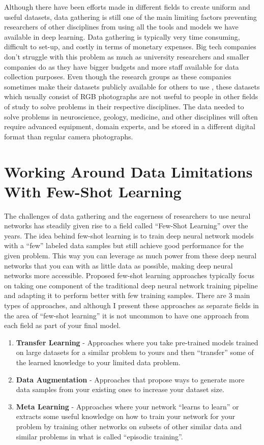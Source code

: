 Although there have been efforts made in different fields to create uniform and useful datasets, data gathering is still one of the main limiting factors preventing researchers of other disciplines from using all the tools and models we have available in deep learning. Data gathering is typically very time consuming, difficult to set-up, and costly in terms of monetary expenses. Big tech companies don't struggle with this problem as much as university researchers and smaller companies do as they have bigger budgets and more staff available for data collection purposes. Even though the research groups as these companies sometimes make their datasets publicly available for others to use \cite{ImageNet} \cite{COCO} \cite{StyleGAN1}, these datasets which usually consist of RGB photographs are not useful to people in other fields of study to solve problems in their respective disciplines. The data needed to solve problems in neuroscience, geology, medicine, and other disciplines will often require advanced equipment, domain experts, and be stored in a different digital format than regular camera photographs.

\section{Working Around Data Limitations With Few-Shot Learning}
The challenges of data gathering and the eagerness of researchers to use neural networks has steadily given rise to a field called ``Few-Shot Learning'' over the years. The idea behind few-shot learning is to train deep neural network models with a ``few'' labeled data samples but still achieve good performance for the given problem. This way you can leverage as much power from these deep neural networks that you can with as little data as possible, making deep neural networks more accessible. Proposed few-shot learning approaches typically focus on taking one component of the traditional deep neural network training pipeline and adapting it to perform better with few training samples. There are 3 main types of approaches, and although I present these approaches as separate fields in the area of ``few-shot learning'' it is not uncommon to have one approach from each field as part of your final model.

\begin{enumerate}
    \item \textbf{Transfer Learning} - Approaches where you take pre-trained models trained on large datasets for a similar problem to yours and then ``transfer'' some of the learned knowledge to your limited data problem.
    \item \textbf{Data Augmentation} - Approaches that propose ways to generate more data samples from your existing ones to increase your dataset size.
    \item \textbf{Meta Learning} - Approaches where your network ``learns to learn'' or extracts some useful knowledge on how to train your network for your problem by training other networks on subsets of other similar data and similar problems in what is called ``episodic training''.
\end{enumerate}

